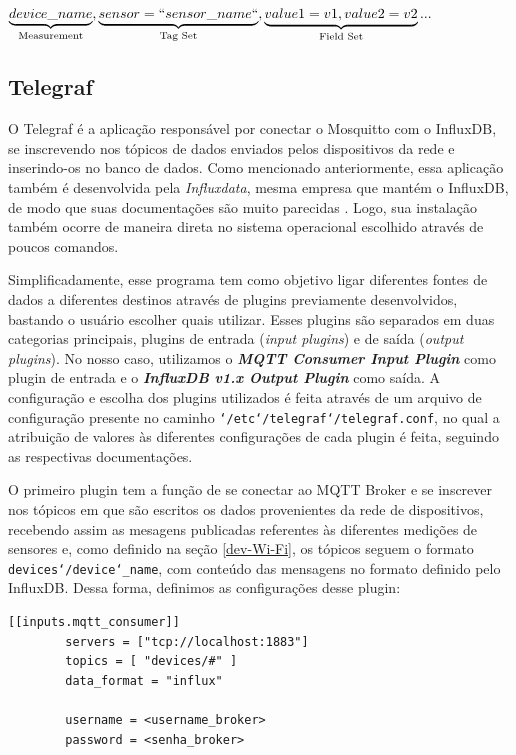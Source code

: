 \documentclass[../monografia.tex]{subfiles}
\begin{document}
\begin{center}
	$\underbrace{device\_name}_\text{Measurement},\underbrace{sensor=``sensor\_name``}_\text{Tag Set},\underbrace{value1=v1,value2=v2}_\text{Field Set}...$
\end{center}

\subsection{Telegraf}

O Telegraf é a aplicação responsável por conectar o Mosquitto com o InfluxDB, se inscrevendo nos tópicos de dados enviados pelos dispositivos da rede e inserindo-os no banco de dados. Como mencionado anteriormente, essa aplicação também é desenvolvida pela \textit{Influxdata}, mesma empresa que mantém o InfluxDB, de modo que suas documentações são muito parecidas \cite{telegraf-installation}. Logo, sua instalação também ocorre de maneira direta no sistema operacional escolhido através de poucos comandos. 

Simplificadamente, esse programa tem como objetivo ligar diferentes fontes de dados a diferentes destinos através de plugins previamente desenvolvidos, bastando o usuário escolher quais utilizar. Esses plugins são separados em duas categorias principais, plugins de entrada (\textit{input plugins}) e de saída (\textit{output plugins}). No nosso caso, utilizamos o \textit{\textbf{MQTT Consumer Input Plugin}} como plugin de entrada e o \textit{\textbf{InfluxDB v1.x Output Plugin}} como saída. A configuração e escolha dos plugins utilizados é feita através de um arquivo de configuração presente no caminho \texttt{\char`/etc\char`/telegraf\char`/telegraf.conf}, no qual a atribuição de valores às diferentes configurações de cada plugin é feita, seguindo as respectivas documentações. 

O primeiro plugin tem a função de se conectar ao MQTT Broker e se inscrever nos tópicos em que são escritos os dados provenientes da rede de dispositivos, recebendo assim as mesagens publicadas referentes às diferentes medições de sensores e, como definido na seção \ref{dev-Wi-Fi}, os tópicos seguem o formato \texttt{devices\char`/device\char`_name}, com conteúdo das mensagens no formato definido pelo InfluxDB. Dessa forma, definimos as configurações desse plugin:

\begin{lstlisting}[basicstyle=\small]
	[[inputs.mqtt_consumer]]
		servers = ["tcp://localhost:1883"]
		topics = [ "devices/#" ]
		data_format = "influx"

		username = <username_broker> 
		password = <senha_broker>
\end{lstlisting}
\end{document}
